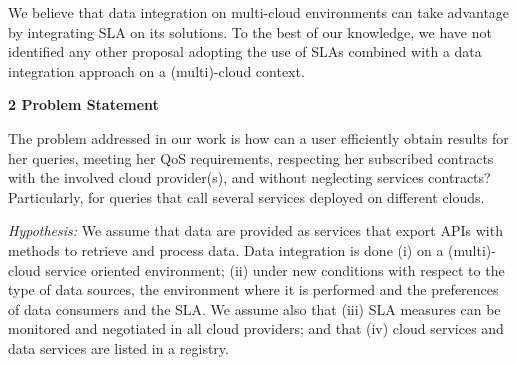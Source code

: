 \documentclass[11pt,a4paper,oneside]{report}
\begin{document}
%
%

We believe that data integration on multi-cloud environments can take advantage by integrating SLA on its solutions. To the best of our knowledge, we have not identified any other proposal adopting the use of SLAs combined with a data integration approach on a (multi)-cloud context.

\begin{flushleft}
\textbf{2 Problem Statement}\\
\end{flushleft}
The problem addressed in our work is how can a user efficiently obtain results for her queries, meeting her QoS requirements, respecting her subscribed contracts with the involved cloud provider(s), and without neglecting services contracts? 
Particularly, for queries that call several services deployed on different clouds.

\noindent
{\em Hypothesis:}  We assume that data are provided as services that export APIs with methods to retrieve  and process data. Data integration is done (i) on a (multi)-cloud service oriented environment;  (ii) under new conditions with respect to the type of data sources, the environment where it is performed and the preferences  of data consumers and the SLA. We assume also that (iii) SLA measures can be monitored and negotiated in all cloud providers; and that (iv) cloud services and data services are listed in a registry.

\end{document}
